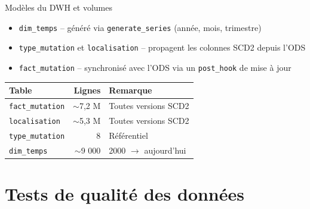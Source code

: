 \documentclass[12pt,aspectratio=169]{beamer}
\newcommand{\sql}[1]{\texttt{\small #1}}
\begin{document}
\begin{frame}{Modèles du DWH et volumes}
  \begin{itemize}
    \item<+-> \texttt{dim\_temps} -- généré via \sql{generate\_series}
          (année, mois, trimestre)
    \item<+-> \texttt{type\_mutation} et \texttt{localisation} -- propagent les
          colonnes SCD2 depuis l'ODS
    \item<+-> \texttt{fact\_mutation} -- synchronisé avec l'ODS via un
          \texttt{post\_hook} de mise à jour
  \end{itemize}
  \begin{table}
    \centering
    \footnotesize
    \begin{tabularx}{\linewidth}{lrl}
      \toprule
      \textbf{Table} & \textbf{Lignes} & \textbf{Remarque} \\
      \midrule
      \texttt{fact\_mutation} & $\sim$7,2 M & Toutes versions SCD2 \\
      \texttt{localisation}   & $\sim$5,3 M & Toutes versions SCD2 \\
      \texttt{type\_mutation} & 8           & Référentiel \\
      \texttt{dim\_temps}     & $\sim$9 000 & 2000 $\to$ aujourd'hui \\
      \bottomrule
    \end{tabularx}
  \end{table}
\end{frame}

\section{Tests de qualité des données}
\end{document}
